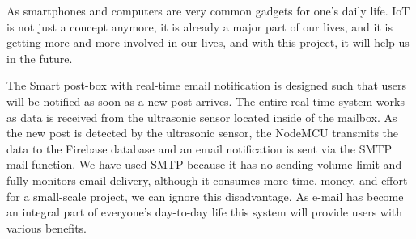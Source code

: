 \label{chapter:Conclusion}

As smartphones and computers are very common gadgets for one’s daily life. IoT is not just a concept anymore, it is already a major part of our lives, and it is getting more and more involved in our lives, and with this project, it will help us in the future.

The Smart post-box with real-time email notification is designed such that users will be notified as soon as a new post arrives. The entire real-time system works as data is received from the ultrasonic sensor located inside of the mailbox. As the new post is detected by the ultrasonic sensor, the NodeMCU transmits the data to the Firebase database and an email notification is sent via the SMTP mail function. We have used SMTP because it has no sending volume limit and fully monitors email delivery, although it consumes more time, money, and effort for a small-scale project, we can ignore this disadvantage. As e-mail has become an integral part of everyone’s day-to-day life this system will provide users with various benefits.
